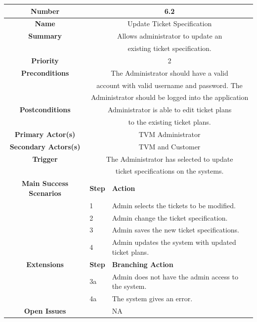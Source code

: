 \documentclass[a4paper,12pt]{report}
\begin{document}
\begin{tabular}{ | c | p{2cm} | p{7cm} |}
	
	\hline
	\textbf{Number} & \multicolumn{2}{c|}{6.2}  \\
	\hline
	\textbf{Name} & \multicolumn{2}{c|}{Update Ticket Specification}  \\
	\hline
	\textbf{Summary} & \multicolumn{2}{c|}{Allows administrator to update an}  \\
					&  \multicolumn{2}{c|}{ existing ticket specification. } \\
	\hline
	\textbf{Priority} & \multicolumn{2}{c|}{2}  \\
	\hline
	\textbf{Preconditions} & \multicolumn{2}{c|}{The Administrator should have a valid }  \\
	&  \multicolumn{2	}{c|}{account with valid username and password. The  } \\
	&  \multicolumn{2	}{c|}{Administrator should be logged into the application} \\
	\hline
	\textbf{Postconditions} & \multicolumn{2}{c|}{Administrator is able to edit ticket plans }  \\
							&  \multicolumn{2}{c|}{to the existing ticket plans. } \\
	\hline
	\textbf{Primary Actor(s)} & \multicolumn{2}{c|}{TVM Administrator}  \\
	\hline
	\textbf{Secondary Actors(s)} & \multicolumn{2}{c|}{TVM and Customer}  \\
	\hline
	\textbf{Trigger} & \multicolumn{2}{c|}{The Administrator has selected to update}  \\
	&  \multicolumn{2}{c|}{ ticket specifications on the systems.} \\
	\hline
	\textbf{Main Success Scenarios} & \textbf{Step} & \textbf{Action} \\
	\hline
	& 1 & Admin selects the tickets to be modified. \\ 
	\hline
	&  2  & Admin change the ticket specification. \\
	\hline
	&  3  & Admin saves the new ticket specifications. \\
	\hline
	&  4  & Admin updates the system with updated ticket plans. \\
	\hline
	
	\textbf{Extensions} & \textbf{Step} & \textbf{Branching Action} \\
	\hline
	&  3a  & Admin does not have the admin access to the system.  \\
	\hline
	&  4a  &  The system gives an error. \\
	\hline
	\textbf{Open Issues} &    & NA \\
	\hline
	
\end{tabular}
\end{document}

